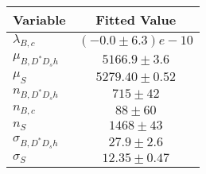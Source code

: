 \begin{tabular}[t]{lc}
\hline
Variable &Fitted Value\\
\hline\hline
$\lambda_{B,c}$&$(-0.0\pm6.3)e-10$\\
\hline
$\mu_{B, D^* D_s h}$&$5166.9\pm3.6$\\
\hline
$\mu_S$&$5279.40\pm0.52$\\
\hline
$n_{B, D^* D_s h}$&$715\pm42$\\
\hline
$n_{B,c}$&$88\pm60$\\
\hline
$n_S$&$1468\pm43$\\
\hline
$\sigma_{B, D^* D_s h}$&$27.9\pm2.6$\\
\hline
$\sigma_S$&$12.35\pm0.47$\\
\hline
\end{tabular}
